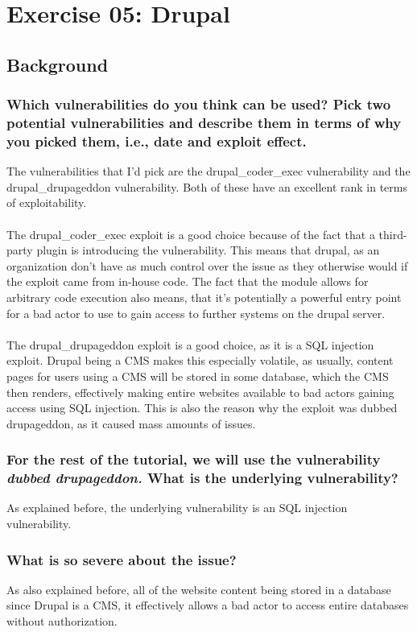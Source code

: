 \section{Exercise 05: Drupal}
\subsection{Background}
\subsubsection{Which vulnerabilities do you think can be used? Pick two potential vulnerabilities and describe them in terms of why you picked them, i.e., date and exploit effect.}
The vulnerabilities that I'd pick are the drupal\_coder\_exec vulnerability and the drupal\_drupageddon vulnerability. Both of these have an excellent rank in terms of exploitability.
\\\\
The drupal\_coder\_exec exploit is a good choice because of the fact that a third-party plugin is introducing the vulnerability. This means that drupal, as an organization don't have as much control over the issue as they otherwise would if the exploit came from in-house code. The fact that the module allows for arbitrary code execution also means, that it's potentially a powerful entry point for a bad actor to use to gain access to further systems on the drupal server.
\\\\
The drupal\_drupageddon exploit is a good choice, as it is a SQL injection exploit. Drupal being a CMS makes this especially volatile, as usually, content pages for users using a CMS will be stored in some database, which the CMS then renders, effectively making entire websites available to bad actors gaining access using SQL injection. This is also the reason why the exploit was dubbed drupageddon, as it caused mass amounts of issues.
\subsubsection{For the rest of the tutorial, we will use the vulnerability \textit{dubbed drupageddon.} What is the underlying vulnerability?}
As explained before, the underlying vulnerability is an SQL injection vulnerability.

\subsubsection{What is so severe about the issue?}
As also explained before, all of the website content being stored in a database since Drupal is a CMS, it effectively allows a bad actor to access entire databases without authorization.


